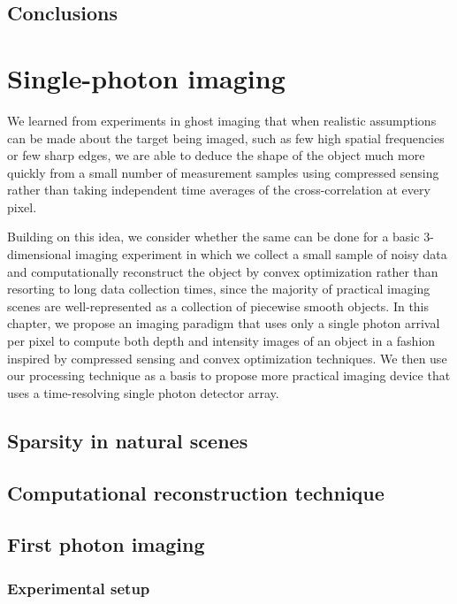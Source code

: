 \documentclass{report}
\begin{document}
\section{Conclusions}

\chapter{Single-photon imaging}
We learned from experiments in ghost imaging that when realistic assumptions can be made about the target being imaged, such as few high spatial frequencies or few sharp edges, we are able to deduce the shape of the object much more quickly from a small number of measurement samples using compressed sensing rather than taking independent time averages of the cross-correlation at every pixel.

Building on this idea, we consider whether the same can be done for a basic 3-dimensional imaging experiment in which we collect a small sample of noisy data and computationally reconstruct the object by convex optimization rather than resorting to long data collection times, since the majority of practical imaging scenes are well-represented as a collection of piecewise smooth objects. In this chapter, we propose an imaging paradigm that uses only a single photon arrival per pixel to compute both depth and intensity images of an object in a fashion inspired by compressed sensing and convex optimization techniques. We then use our processing technique as a basis to propose more practical imaging device that uses a time-resolving single photon detector array.

\section{Sparsity in natural scenes}

\section{Computational reconstruction technique}

\section{First photon imaging}

\subsection{Experimental setup}
\end{document}
